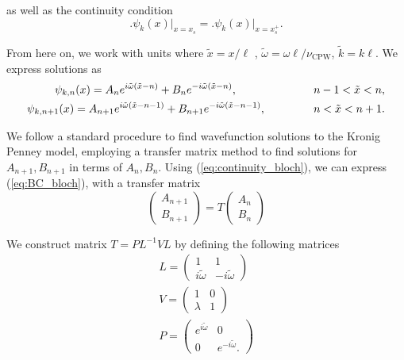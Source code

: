 as well as the continuity condition
\begin{equation}\label{eq:continuity_bloch}
\biggl.\psi_{k}(x)\biggl|_{x=x_{s}}=\biggl.\psi_{k}(x)\biggr|_{x=x_{s}^{+}}.
\end{equation}

From here on, we work with units where $\tilde{x}=x/\ell$ , $\tilde{\omega}=\omega\ell/\nu_{\text{CPW}}$, $\tilde{k}= k\ell$. We express solutions as
\begin{align}
\psi_{k,n}(x) = A_n e^{i\tilde{\omega}(\tilde{x}-n)} + B_n e^{-i\tilde{\omega}(\tilde{x}-n)},\hspace{16ex} n-1 < \tilde{x} < n,\\
\psi_{k,n+1}(x) = A_{n+1} e^{i\tilde{\omega}(\tilde{x}-n-1)} + B_{n+1} e^{-i\tilde{\omega}(\tilde{x}-n-1)},\hspace{10ex} n < \tilde{x} < n+1.
\end{align}

We follow a standard procedure to find wavefunction solutions to the Kronig Penney model, employing a transfer matrix method to find solutions for $A_{n+1}, B_{n+1}$ in terms of $A_n, B_n$. Using (\ref{eq:continuity_bloch}), we can express (\ref{eq:BC_bloch}), with a transfer matrix 
\begin{equation}
 \begin{pmatrix}
 A_{n+1} \\ B_{n+1}
 \end{pmatrix}
 = T 
 \begin{pmatrix}
 A_n \\ B_n
 \end{pmatrix}
\end{equation}{}

We construct matrix $T=PL^{-1}VL$ by defining the following matrices 
\begin{align}
L = \begin{pmatrix}
1 & 1 \\
i\tilde{\omega} & -i\tilde{\omega}
\end{pmatrix} \\
V = \begin{pmatrix}
1 & 0 \\
\lambda & 1
\end{pmatrix} \\
P = \begin{pmatrix}
e^{i\tilde{\omega}} & 0 \\
0 & e^{-i\tilde{\omega}}.
\end{pmatrix}
\end{align} 

